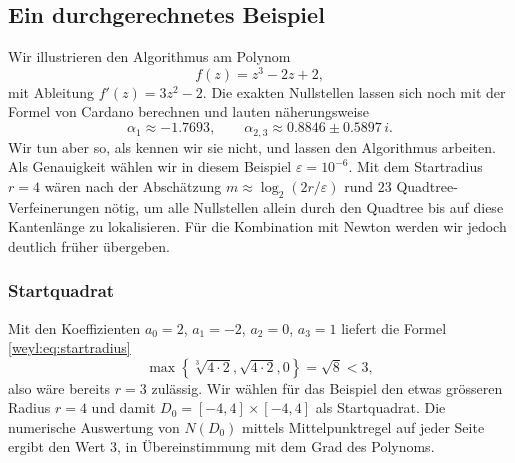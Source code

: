 \subsection{Ein durchgerechnetes Beispiel%
\label{weyl:subsection:beispiel}}
Wir illustrieren den Algorithmus am Polynom
\begin{equation}
f(z)
=
z^3 - 2z + 2
,
\label{weyl:eq:beispiel-polynom}
\end{equation}
mit Ableitung $f'(z) = 3z^2 - 2$.
Die exakten Nullstellen lassen sich noch mit der Formel von Cardano berechnen und
%
lauten näherungsweise
\[
\alpha_1 \approx -1.7693
,
\qquad
\alpha_{2,3} \approx 0.8846 \pm 0.5897\,i
.
\]
Wir tun aber so, als kennen wir sie nicht, und lassen den Algorithmus arbeiten.
Als Genauigkeit wählen wir in diesem Beispiel $\varepsilon = 10^{-6}$.
Mit dem Startradius $r=4$ wären nach der Abschätzung
$m \approx \log_2(2r/\varepsilon)$ rund $23$ Quadtree-Verfeinerungen nötig, um alle
Nullstellen allein durch den Quadtree bis auf diese Kantenlänge zu lokalisieren.
Für die Kombination mit Newton werden wir jedoch deutlich früher übergeben.

\subsubsection*{Startquadrat}
Mit den Koeffizienten $a_0 = 2$, $a_1 = -2$, $a_2 = 0$, $a_3 = 1$ liefert die Formel
\eqref{weyl:eq:startradius}
\[
\max
\left\{
\sqrt[3]{4\cdot 2},
\sqrt{4\cdot 2},
0
\right\}
=
\sqrt{8}
<
3
,
\]
also wäre bereits $r=3$ zulässig.
Wir wählen für das Beispiel den etwas grösseren Radius $r=4$ und damit
$D_0 = [-4, 4] \times [-4, 4]$ als Startquadrat.
Die numerische Auswertung von $N(D_0)$ mittels Mittelpunktregel auf jeder Seite
ergibt den Wert $3$, in Übereinstimmung
mit dem Grad des Polynoms.

